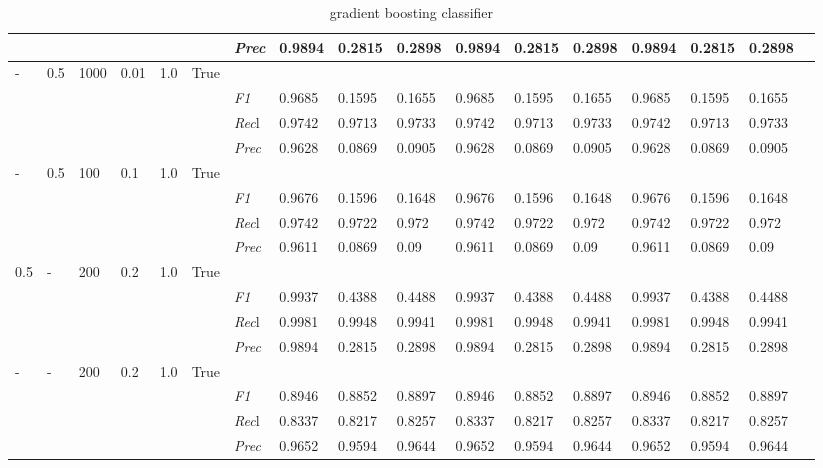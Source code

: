 \begin{table}[]
\begin{tabularx}{\textwidth}{XXXXXX|X|XXX|XXX|XXXX}
    & & & & & & \textit{Prec} & 0.9894 & 0.2815 & 0.2898 & 0.9894 & 0.2815 & 0.2898 & 0.9894 & 0.2815 & 0.2898 \\ \midrule
    - & 0.5 & 1000 & 0.01 & 1.0 &True & & & & & & & & & \\
    & & & & & & \textit{F1} & 0.9685 & 0.1595 & 0.1655 & 0.9685 & 0.1595        & 0.1655        & 0.9685        & 0.1595        & 0.1655        \\
    & & & & & & \textit{Rec}l & 0.9742 & 0.9713 & 0.9733    & 0.9742 & 0.9713    & 0.9733    & 0.9742    & 0.9713    & 0.9733    \\
    & & & & & & \textit{Prec} & 0.9628 & 0.0869 & 0.0905 & 0.9628 & 0.0869 & 0.0905 & 0.9628 & 0.0869 & 0.0905 \\ \midrule
    - & 0.5 & 100 & 0.1 & 1.0 &True & & & & & & & & & \\
    & & & & & & \textit{F1} & 0.9676 & 0.1596 & 0.1648 & 0.9676 & 0.1596        & 0.1648        & 0.9676        & 0.1596        & 0.1648        \\
    & & & & & & \textit{Rec}l & 0.9742 & 0.9722 & 0.972    & 0.9742 & 0.9722    & 0.972    & 0.9742    & 0.9722    & 0.972    \\
    & & & & & & \textit{Prec} & 0.9611 & 0.0869 & 0.09 & 0.9611 & 0.0869 & 0.09 & 0.9611 & 0.0869 & 0.09 \\ \midrule
    0.5 & - & 200 & 0.2 & 1.0 &True & & & & & & & & & \\
    & & & & & & \textit{F1} & 0.9937 & 0.4388 & 0.4488 & 0.9937 & 0.4388        & 0.4488        & 0.9937        & 0.4388        & 0.4488        \\
    & & & & & & \textit{Rec}l & 0.9981 & 0.9948 & 0.9941    & 0.9981 & 0.9948    & 0.9941    & 0.9981    & 0.9948    & 0.9941    \\
    & & & & & & \textit{Prec} & 0.9894 & 0.2815 & 0.2898 & 0.9894 & 0.2815 & 0.2898 & 0.9894 & 0.2815 & 0.2898 \\ \midrule
    - & - & 200 & 0.2 & 1.0 &True & & & & & & & & & \\
    & & & & & & \textit{F1} & 0.8946 & 0.8852 & 0.8897 & 0.8946 & 0.8852        & 0.8897        & 0.8946        & 0.8852        & 0.8897        \\
    & & & & & & \textit{Rec}l & 0.8337 & 0.8217 & 0.8257    & 0.8337 & 0.8217    & 0.8257    & 0.8337    & 0.8217    & 0.8257    \\
    & & & & & & \textit{Prec} & 0.9652 & 0.9594 & 0.9644 & 0.9652 & 0.9594 & 0.9644 & 0.9652 & 0.9594 & 0.9644 \\ \midrule
    \end{tabularx}
    \caption{gradient boosting classifier}
    \label{tab:all_results_gradient_boosting_classifier}
    \end{table}
    
